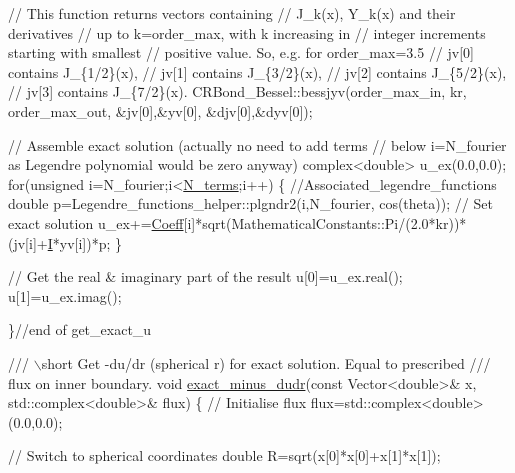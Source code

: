 \begin{DoxyCodeInclude}
  \textcolor{comment}{// This function returns vectors containing }
  \textcolor{comment}{// J\_k(x), Y\_k(x) and their derivatives}
  \textcolor{comment}{// up to k=order\_max, with k increasing in}
  \textcolor{comment}{// integer increments starting with smallest}
  \textcolor{comment}{// positive value. So, e.g. for order\_max=3.5}
  \textcolor{comment}{// jv[0] contains J\_\{1/2\}(x),}
  \textcolor{comment}{// jv[1] contains J\_\{3/2\}(x),}
  \textcolor{comment}{// jv[2] contains J\_\{5/2\}(x),}
  \textcolor{comment}{// jv[3] contains J\_\{7/2\}(x).}
  CRBond\_Bessel::bessjyv(order\_max\_in,
                         kr,
                         order\_max\_out,
                         &jv[0],&yv[0],
                         &djv[0],&dyv[0]);
  
  
  \textcolor{comment}{// Assemble  exact solution (actually no need to add terms}
  \textcolor{comment}{// below i=N\_fourier as Legendre polynomial would be zero anyway)}
  complex<double> u\_ex(0.0,0.0);
  \textcolor{keywordflow}{for}(\textcolor{keywordtype}{unsigned} i=N\_fourier;i<\hyperlink{namespacePlanarWave_a56abdb2474ccaffd88346ee3607d8672}{N\_terms};i++)
   \{
    \textcolor{comment}{//Associated\_legendre\_functions}
    \textcolor{keywordtype}{double} p=Legendre\_functions\_helper::plgndr2(i,N\_fourier,
                                                cos(theta));
    \textcolor{comment}{// Set exact solution}
    u\_ex+=\hyperlink{namespaceProblemParameters_acb1788444ef78fe2adec824504f24246}{Coeff}[i]*sqrt(MathematicalConstants::Pi/(2.0*kr))*(jv[i]+\hyperlink{namespacePlanarWave_a541691caf71477c8c389062797c0fdab}{I}*yv[i])*p;
   \}
  
  \textcolor{comment}{// Get the real & imaginary part of the result}
  u[0]=u\_ex.real();
  u[1]=u\_ex.imag();
  
 \}\textcolor{comment}{//end of get\_exact\_u}

 \textcolor{comment}{}
\textcolor{comment}{ /// \(\backslash\)short Get -du/dr (spherical r) for exact solution. Equal to prescribed}
\textcolor{comment}{ /// flux on inner boundary.}
\textcolor{comment}{} \textcolor{keywordtype}{void} \hyperlink{namespaceProblemParameters_aa544d1f3e384d3283f7113512931ea8f}{exact\_minus\_dudr}(\textcolor{keyword}{const} Vector<double>& x, std::complex<double>& flux)
 \{
  \textcolor{comment}{// Initialise flux}
  flux=std::complex<double>(0.0,0.0);
  
  \textcolor{comment}{// Switch to spherical coordinates}
  \textcolor{keywordtype}{double} R=sqrt(x[0]*x[0]+x[1]*x[1]);
  

\end{DoxyCodeInclude}
